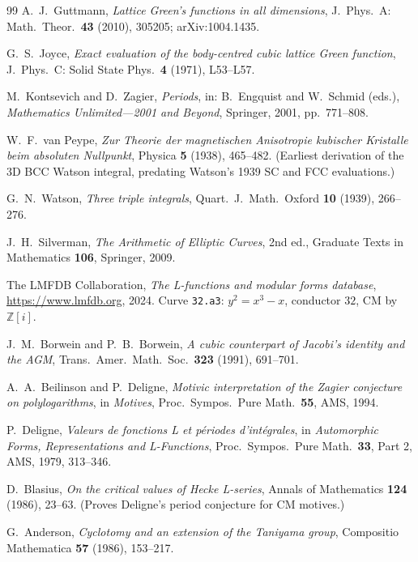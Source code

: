 \documentclass[11pt]{article}
\theoremstyle{definition}
\theoremstyle{remark}
\newcommand{\Z}{\mathbb{Z}}
\begin{document}
\begin{thebibliography}{99}
A.~J.\ Guttmann,
\textit{Lattice Green's functions in all dimensions},
J.\ Phys.\ A: Math.\ Theor.\ \textbf{43} (2010), 305205;
arXiv:1004.1435.

G.~S.\ Joyce,
\textit{Exact evaluation of the body-centred cubic lattice Green function},
J.\ Phys.\ C: Solid State Phys.\ \textbf{4} (1971), L53--L57.

M.\ Kontsevich and D.\ Zagier,
\textit{Periods},
in: B.\ Engquist and W.\ Schmid (eds.), \emph{Mathematics Unlimited---2001 and Beyond},
Springer, 2001, pp.\ 771--808.

W.~F.\ van Peype,
\emph{Zur Theorie der magnetischen Anisotropie kubischer Kristalle beim absoluten Nullpunkt},
Physica \textbf{5} (1938), 465--482. (Earliest derivation of the
3D BCC Watson integral, predating Watson's 1939 SC and FCC evaluations.)

G.~N.\ Watson,
\textit{Three triple integrals},
Quart.\ J.\ Math.\ Oxford \textbf{10} (1939), 266--276.

J.~H.\ Silverman,
\emph{The Arithmetic of Elliptic Curves},
2nd ed., Graduate Texts in Mathematics \textbf{106}, Springer, 2009.

The LMFDB Collaboration,
\textit{The L-functions and modular forms database},
\url{https://www.lmfdb.org}, 2024.
Curve \texttt{32.a3}: $y^2 = x^3 - x$, conductor $32$, CM by $\Z[i]$.

J.~M.\ Borwein and P.~B.\ Borwein,
\textit{A cubic counterpart of Jacobi's identity and the AGM},
Trans.\ Amer.\ Math.\ Soc.\ \textbf{323} (1991), 691--701.

A.~A.\ Beilinson and P.\ Deligne,
\textit{Motivic interpretation of the Zagier conjecture on polylogarithms},
in \emph{Motives}, Proc.\ Sympos.\ Pure Math.\ \textbf{55}, AMS, 1994.

P.\ Deligne,
\textit{Valeurs de fonctions L et p\'eriodes d'int\'egrales},
in \emph{Automorphic Forms, Representations and L-Functions},
Proc.\ Sympos.\ Pure Math.\ \textbf{33}, Part 2, AMS, 1979, 313--346.

D.\ Blasius,
\textit{On the critical values of Hecke L-series},
Annals of Mathematics \textbf{124} (1986), 23--63.
(Proves Deligne's period conjecture for CM motives.)

G.\ Anderson,
\textit{Cyclotomy and an extension of the Taniyama group},
Compositio Mathematica \textbf{57} (1986), 153--217.


\end{thebibliography}
\end{document}
